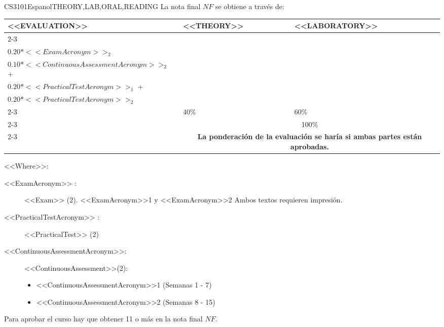  \begin{evaluation}{CS3101}{Espanol}{THEORY,LAB,ORAL,READING}
  La nota final $NF$ se obtiene a través de: \\
 
  \begin{tabularx}{0.9\textwidth}{|X|p{}|p{}|} \hline
  \multirow{4}{*}{\uppercase{<<Evaluation>>}} & \uppercase{<<Theory>>} & \uppercase{<<Laboratory>>} \\ \cline{2-3}
  & %
      \begin{minipage}{0.95\textwidth}
      \begin{tabular}{l}
        $0.20*<<ExamAcronym>>_{1}$  + \\
        $0.20*<<ExamAcronym>>_{2}$ 
      \end{tabular} 
      \end{minipage} 
  & %
      \begin{minipage}{0.95\textwidth}
      \begin{tabular}{l}
        $0.10*<<ContinuousAssessmentAcronym>>_{1}$  + \\
        $0.10*<<ContinuousAssessmentAcronym>>_{2}$  + \\
        $0.20*<<PracticalTestAcronym>>_{1}$  +  \\
        $0.20*<<PracticalTestAcronym>>_{2}$
      \end{tabular} 
      \end{minipage}                 \\ \cline{2-3}
  
  & %
  40\% 
  & %
  60\% \\ \cline{2-3}
  & \multicolumn{2}{c|}{100\%}  \\ \cline{2-3}
  & \multicolumn{2}{c|}{\textbf{La ponderación de la evaluación se haría si ambas partes están aprobadas.}}  \\ \hline
  \end{tabularx}
    
  \vspace{2mm}
  \noindent <<Where>>:
  \begin{description}
    \item[<<ExamAcronym>> :] <<Exam>> (2). <<ExamAcronym>>1 y <<ExamAcronym>>2  Ambos textos requieren impresión.
    \item[<<PracticalTestAcronym>> :] <<PracticalTest>> (2)
    \item[<<ContinuousAssessmentAcronym>>:]<<ContinuousAssessment>>(2):
      \begin{itemize}
          \item <<ContinuousAssessmentAcronym>>1 (Semanas 1 - 7) 
          \item <<ContinuousAssessmentAcronym>>2 (Semanas 8 - 15)
      \end{itemize}
  \end{description}

  \noindent Para aprobar el curso hay que obtener 11 o más en la nota final $NF$.
  \end{evaluation}

